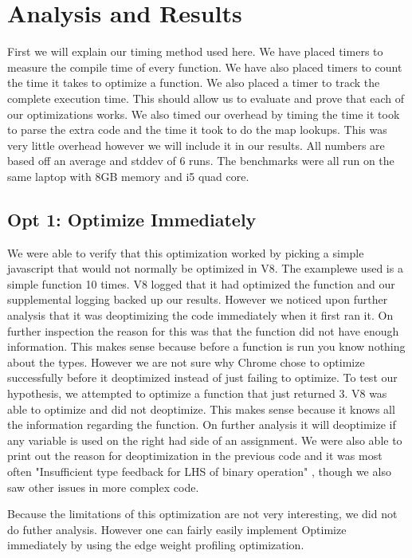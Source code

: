 \documentclass[twocolumn,showpacs,%
  nofootinbib,aps,superscriptaddress,%
  eqsecnum,prd,notitlepage,showkeys,10pt]{revtex4-1}
\begin{document}
\section{Analysis and Results}
First we will explain our timing method used here. We have placed timers to measure the compile time of every function. We have also placed timers to count the time it takes to optimize a function. We also placed a timer to track the complete execution time. This should allow us to evaluate and prove that each of our optimizations works. We also timed our overhead by timing the time it took to parse the extra code and the time it took to do the map lookups. This was very little overhead however we will include it in our results. All numbers are based off an average and stddev of 6 runs. The benchmarks were all run on the same laptop with 8GB memory and i5 quad core.

\subsection{Opt 1: Optimize Immediately}
We were able to verify that this optimization worked by picking a simple javascript that would not normally be optimized in V8. The examplewe used is a simple function 10 times. V8 logged that it had optimized the function and our supplemental logging backed up our results.  However we noticed upon further analysis that it was deoptimizing the code immediately when it first ran it. On further inspection the reason for this was that the function did not have enough information. This makes sense because before a function is run you know nothing about the types. However we are not sure why Chrome chose to optimize successfully before it deoptimized instead of just failing to optimize. To test our hypothesis, we attempted to optimize a function that just returned 3. V8 was able to optimize and did not deoptimize. This makes sense because it knows all the information regarding the function. On further analysis it will deoptimize if any variable is used on the right had side of an assignment. We were also able to print out the reason for deoptimization in the previous code and it was most often "Insufficient type feedback for LHS of binary operation" , though we also saw other issues in more complex code.

Because the limitations of this optimization are not very interesting, we did not do futher analysis. However one can fairly easily implement Optimize immediately by using the edge weight profiling optimization.
\end{document}
